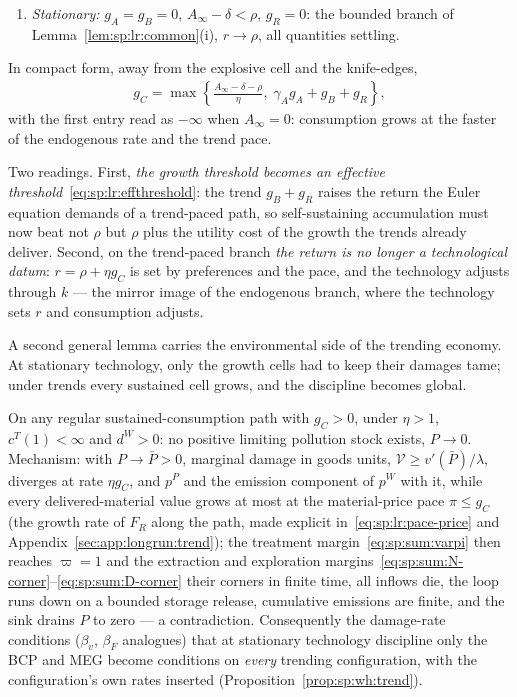 \begin{lemma}
\begin{enumerate}
    equality in the Cobb--Douglas case, where they settle).
    \item \emph{Stationary:} $g_A=g_B=0$, $A_\infty-\delta<\rho$, $g_R=0$: the bounded branch
    of Lemma~\ref{lem:sp:lr:common}(i), $r\to\rho$, all quantities settling.
\end{enumerate}
In compact form, away from the explosive cell and the knife-edges,
\begin{align}
g_C=\max\left\{\frac{A_\infty-\delta-\rho}{\eta},\;\gamma_Ag_A+g_B+g_R\right\},
\label{eq:sp:lr:gCmax}
\end{align}
with the first entry read as $-\infty$ when $A_\infty=0$: consumption grows at the faster of
the endogenous rate and the trend pace.
\end{lemma}

Two readings. First, \emph{the growth threshold becomes an effective
threshold}~\eqref{eq:sp:lr:effthreshold}: the trend $g_B+g_R$ raises the return the Euler
equation demands of a trend-paced path, so self-sustaining accumulation must now beat not
$\rho$ but $\rho$ plus the utility cost of the growth the trends already deliver. Second, on
the trend-paced branch \emph{the return is no longer a technological datum}:
$r=\rho+\eta g_C$ is set by preferences and the pace, and the technology adjusts through $k$
--- the mirror image of the endogenous branch, where the technology sets $r$ and consumption
adjusts.

A second general lemma carries the environmental side of the trending economy. At stationary
technology, only the growth cells had to keep their damages tame; under trends every
sustained cell grows, and the discipline becomes global.

\begin{lemma}\label{lem:sp:lr:affluence}
On any regular sustained-consumption path with $g_C>0$, under $\eta>1$, $c^T\left(1\right)<\infty$
and $d^W>0$: no positive limiting pollution stock exists, $P\to0$. Mechanism: with
$P\to\bar P>0$, marginal damage in goods units,
$\mathcal V\ge v'\left(\bar P\right)/\lambda$, diverges at rate $\eta g_C$, and $p^P$ and the
emission component of $p^W$ with it, while every delivered-material value grows at most at
the material-price pace $\pi\le g_C$ (the growth rate of $F_R$ along the path, made explicit
in~\eqref{eq:sp:lr:pace-price} and Appendix~\ref{sec:app:longrun:trend}); the treatment
margin~\eqref{eq:sp:sum:varpi} then reaches $\varpi=1$ and the extraction and exploration
margins~\eqref{eq:sp:sum:N-corner}--\eqref{eq:sp:sum:D-corner} their corners in finite time,
all inflows die, the loop runs down on a bounded storage release, cumulative emissions are
finite, and the sink drains $P$ to zero --- a contradiction. Consequently the damage-rate
conditions ($\beta_v$, $\beta_F$ analogues) that at stationary technology discipline only
the BCP and MEG become conditions on \emph{every} trending configuration, with the
configuration's own rates inserted (Proposition~\ref{prop:sp:wh:trend}).
\end{lemma}

